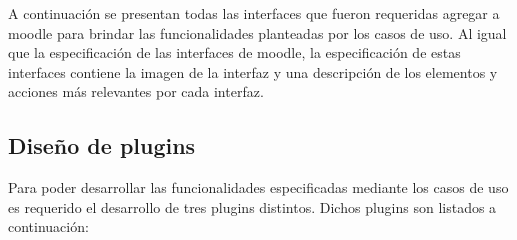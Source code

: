  A continuación se presentan todas las interfaces que fueron requeridas agregar
 a moodle para brindar las funcionalidades planteadas por los casos de uso. Al igual
 que la especificación de las interfaces de moodle, la especificación de estas
 interfaces contiene la imagen de la interfaz y una descripción de los elementos
 y acciones más relevantes por cada interfaz.



\subsection*{Diseño de plugins} %

 Para poder desarrollar las funcionalidades especificadas mediante los casos de uso
 es requerido el desarrollo de tres plugins distintos. Dichos plugins son listados a
 continuación:


